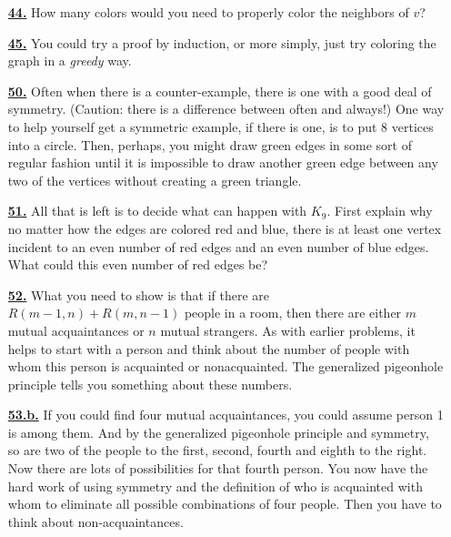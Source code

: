 \documentclass[10pt,]{book}
\theoremstyle{plain}
\theoremstyle{definition}
\theoremstyle{definition}
\theoremstyle{definition}
\numberwithin{equation}{chapter}
\begin{document}
\begin{itemize}[itemsep=1em]
\hypertarget{a-44}{}\item[\textbf{\hyperref[activity-37]{44.}}]
\hypertarget{p-390}{}%
How many colors would you need to properly color the neighbors of \(v\)?%

\hypertarget{a-45}{}\item[\textbf{\hyperref[activity-38]{45.}}]
\hypertarget{p-393}{}%
You could try a proof by induction, or more simply, just try coloring the graph in a \emph{greedy} way.%

\hypertarget{a-50}{}\item[\textbf{\hyperref[activity-43]{50.}}]
\hypertarget{p-417}{}%
Often when there is a counter-example, there is one with a good deal of symmetry. (Caution: there is a difference between often and always!) One way to help yourself get a symmetric example, if there is one, is to put 8 vertices into a circle. Then, perhaps, you might draw green edges in some sort of regular fashion until it is impossible to draw another green edge between any two of the vertices without creating a green triangle.%

\hypertarget{a-51}{}\item[\textbf{\hyperref[activity-44]{51.}}]
\hypertarget{p-419}{}%
All that is left is to decide what can happen with \(K_9\).  First explain why no matter how the edges are colored red and blue, there is at least one vertex incident to an even number of red edges and an even number of blue edges.  What could this even number of red edges be?%

\hypertarget{a-52}{}\item[\textbf{\hyperref[Ramseyrecurrence]{52.}}]
\hypertarget{p-423}{}%
What you need to show is that if there are \(R(m - 1, n) + R(m, n - 1)\) people in a room, then there are either \(m\) mutual acquaintances or \(n\) mutual strangers. As with earlier problems, it helps to start with a person and think about the number of people with whom this person is acquainted or nonacquainted. The generalized pigeonhole principle tells you something about these numbers.%

\hypertarget{a-53.b}{}\item[\textbf{\hyperref[task-61]{53.b.}}]
\hypertarget{p-428}{}%
If you could find four mutual acquaintances, you could assume person 1 is among them. And by the generalized pigeonhole principle and symmetry, so are two of the people to the first, second, fourth and eighth to the right. Now there are lots of possibilities for that fourth person. You now have the hard work of using symmetry and the definition of who is acquainted with whom to eliminate all possible combinations of four people. Then you have to think about non-acquaintances.%


\end{itemize}
\end{document}
